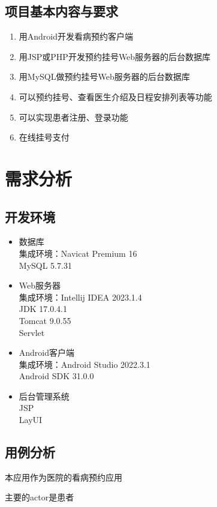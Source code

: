\documentclass[UTF8,12pt]{article}
\begin{document}
\subsection{项目基本内容与要求}
\begin{enumerate}
    \item 用Android开发看病预约客户端
    \item 用JSP或PHP开发预约挂号Web服务器的后台数据库
    \item 用MySQL做预约挂号Web服务器的后台数据库
    \item 可以预约挂号、查看医生介绍及日程安排列表等功能
    \item 可以实现患者注册、登录功能
    \item 在线挂号支付
\end{enumerate}

\section{需求分析}
\subsection{开发环境}
\begin{itemize}
    \item 数据库
    \\集成环境：Navicat Premium 16
    \\MySQL 5.7.31
    \item Web服务器
    \\集成环境：Intellij IDEA 2023.1.4
    \\JDK 17.0.4.1
    \\Tomcat 9.0.55
    \\Servlet
    \item Android客户端
    \\集成环境：Android Studio 2022.3.1
    \\Android SDK 31.0.0
    \item 后台管理系统
    \\JSP
    \\LayUI
\end{itemize}

\subsection{用例分析}
本应用作为医院的看病预约应用

主要的actor是患者
\end{document}
